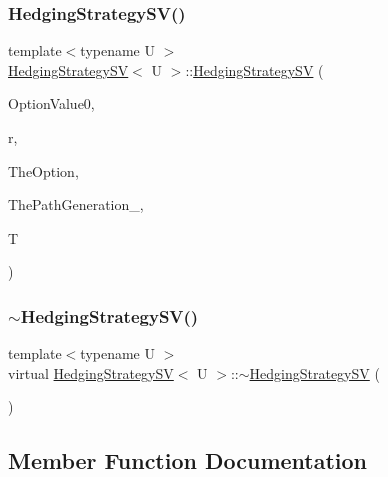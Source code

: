 \subsubsection{\texorpdfstring{Hedging\+Strategy\+S\+V()}{HedgingStrategySV()}}
{\footnotesize\ttfamily template$<$typename U $>$ \\
\hyperlink{classHedgingStrategySV}{Hedging\+Strategy\+SV}$<$ U $>$\+::\hyperlink{classHedgingStrategySV}{Hedging\+Strategy\+SV} (\begin{DoxyParamCaption}\item[{double}]{Option\+Value0,  }\item[{double}]{r,  }\item[{shared\+\_\+ptr$<$ U $>$}]{The\+Option,  }\item[{shared\+\_\+ptr$<$ \hyperlink{classPathGenerationHeston}{Path\+Generation\+Heston} $>$}]{The\+Path\+Generation\+\_\+,  }\item[{double}]{T }\end{DoxyParamCaption})}

\hypertarget{classHedgingStrategySV_ae9105e2ff747d92d970fda66de06d8d0}{}\label{classHedgingStrategySV_ae9105e2ff747d92d970fda66de06d8d0} 
\subsubsection{\texorpdfstring{$\sim$\+Hedging\+Strategy\+S\+V()}{~HedgingStrategySV()}}
{\footnotesize\ttfamily template$<$typename U $>$ \\
virtual \hyperlink{classHedgingStrategySV}{Hedging\+Strategy\+SV}$<$ U $>$\+::$\sim$\hyperlink{classHedgingStrategySV}{Hedging\+Strategy\+SV} (\begin{DoxyParamCaption}{ }\end{DoxyParamCaption})\hspace{0.3cm}{\ttfamily [virtual]}}



\subsection{Member Function Documentation}
\hypertarget{classHedgingStrategySV_abb9531c069f4d1e758fc23c4bc7ed09c}{}\label{classHedgingStrategySV_abb9531c069f4d1e758fc23c4bc7ed09c} 
